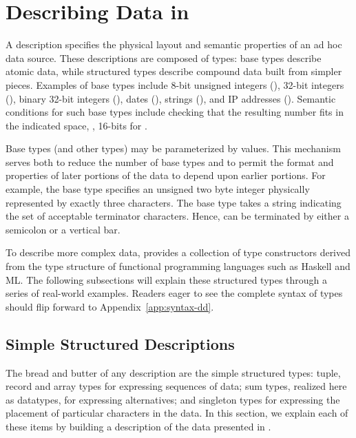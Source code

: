 \section{Describing Data in \datatypebig{} }
\label{sec:data-description}

A \datatype{} description specifies the physical layout and semantic
properties of an ad hoc data source.  
These descriptions are composed of types: 
base types describe atomic data, while structured
types describe compound data built from simpler pieces.  Examples of
base types include 8-bit unsigned integers (), 32-bit
integers (), binary 32-bit integers (), dates
(), strings (), and IP addresses ().
Semantic conditions for such base types include checking that the
resulting number fits in the indicated space, \ie, 16-bits for
.

Base types (and other types) may be parameterized by values.  This
mechanism serves both to reduce the number of base types and to permit
the format and properties of later portions of the data to depend upon
earlier portions.  For example, the base type 
specifies an unsigned two byte integer physically represented by
exactly three characters. The base type  takes 
a string indicating the set of acceptable terminator characters. Hence, 
 can be terminated by either a semicolon or a
vertical bar.


To describe more complex data, \datatype{} provides a collection of
type constructors derived from the type structure of functional
programming languages such as Haskell and ML.  The following
subsections will explain these structured types through a series 
of real-world examples.  Readers eager to see the complete syntax
of types should flip forward to Appendix~\ref{app:syntax-dd}.

\subsection{Simple Structured Descriptions}

The bread and butter of any \datatype{} description are the
simple structured types: tuple, record and array types for expressing
sequences of data; sum types, realized here as datatypes, for
expressing alternatives; and singleton types for expressing
the placement of particular characters in the data.  In this section, we
explain each of these items by building a description 
of the \dibbler{} data presented in .

